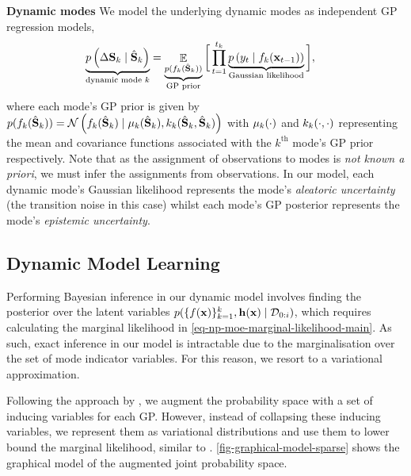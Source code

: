 \documentclass[twoside]{article}
\DeclareMathOperator{\E}{\mathbb{E}}
\newcommand{\numData}{\ensuremath{t}}
\newcommand{\modeInd}{\ensuremath{k}}
\newcommand{\NumData}{\ensuremath{\MakeUppercase{\numData}}}
\newcommand{\ModeInd}{\ensuremath{\MakeUppercase{\modeInd}}}
\newcommand{\singleData}[1]{\ensuremath{#1_{\numData}}}
\newcommand{\allData}[1]{\ensuremath{\MakeUppercase{#1}}}
\newcommand{\mode}[1]{\ensuremath{#1_{\modeInd}}}
\newcommand{\state}{\ensuremath{\mathbf{x}}}
\newcommand{\x}{\ensuremath{\mathbf{x}}}
\newcommand{\y}{\ensuremath{y}}
\newcommand{\dataset}{\ensuremath{\mathcal{D}}}
\newcommand{\singleInput}{\ensuremath{\x_{\numData-1}}}
\newcommand{\singleOutput}{\ensuremath{\singleData{\y}}}
\newcommand{\allInput}{\ensuremath{\allData{\x}}}
\newcommand{\allState}{\ensuremath{\allData{\state}}}
\newcommand{\noiseVar}{\ensuremath{\sigma}}
\newcommand{\gatingFunc}{\ensuremath{h}}
\newcommand{\GatingFunc}{\ensuremath{\mathbf{\gatingFunc}}}
\newcommand{\latentFunc}{\ensuremath{f}}
\begin{document}
\textbf{Dynamic modes}
We model the underlying dynamic modes as independent GP regression models,
\begin{align}
\underbrace{p\left(\allOutputK \mid \allInputK \right)}_{\text{dynamic mode } \modeInd}
&= \underbrace{\E_{p(\mode{\latentFunc}(\allInputK))}}_{\text{GP prior}} \bigg[
\prod_{\numData=1}^{\NumData_{\modeInd}}
\underbrace{p\left(\singleOutput \mid \mode{\latentFunc}(\singleInput)\right)}_{\text{Gaussian likelihood}}
\bigg], \nonumber
\end{align}
where each mode's GP prior is given by
\(p(\mode{\latentFunc}(\allInputK)) = \mathcal{N} \left( \mode{\latentFunc}(\allInputK) \mid \expertMeanFunc(\allInputK), \expertCovFunc(\allInputK, \allInputK) \right)\)
with \(\expertMeanFunc(\cdot)\) and \(\expertCovFunc(\cdot, \cdot)\) representing the mean and
covariance functions associated with the \(\modeInd^{\text{th}}\) mode's GP prior respectively.
Note that as the assignment of observations to modes is \emph{not known a priori}, we must infer the assignments from observations.
In our model, each dynamic mode's Gaussian likelihood represents the mode's \emph{aleatoric uncertainty} (the transition noise in this case)
whilst each mode's GP posterior represents the mode's \emph{epistemic uncertainty}.

\subsection{Dynamic Model Learning \label{sec-dynamics-learning}}
\label{sec:org2ba2001}
Performing Bayesian inference in our dynamic model involves finding the posterior over the latent variables
\(p(\{\latentFunc(\allInput)\}_{\modeInd=1}^{\ModeInd}, \GatingFunc(\allState) \mid \dataset_{0:i})\),
which requires calculating the marginal likelihood in \cref{eq-np-moe-marginal-likelihood-main}.
As such, exact inference in our model is intractable due to the marginalisation over the set of mode
indicator variables. For this reason, we resort to a variational approximation.



Following the approach by \cite{titsiasVariational2009}, we augment the probability space
with a set of inducing variables for each GP.
However, instead of collapsing these inducing variables, we
represent them as variational distributions and use them to lower bound the marginal likelihood, similar to
\cite{hensmanGaussian2013,hensmanScalable2015}.
\cref{fig-graphical-model-sparse} shows the graphical model of the augmented joint probability space.
\end{document}
